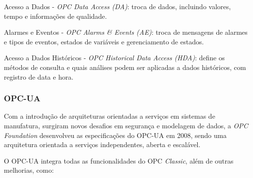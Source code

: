         \begin{alineascomponto}
        	\item Acesso a Dados - \textit{\gls{OPC} Data Access (DA)}: troca de dados, incluindo valores, tempo e informações de qualidade.
        	\item Alarmes e Eventos - \textit{\gls{OPC} Alarms \& Events (AE)}: troca de mensagens de alarmes e tipos de eventos, estados de variáveis e gerenciamento de estados.
        	\item Acesso a Dados Históricos - \textit{\gls{OPC} Historical Data Access (HDA)}: define os métodos de consulta e quais análises podem ser aplicadas a dados históricos, com registro de data e hora.
        \end{alineascomponto}

    \subsubsection{OPC-UA}
    \label{sec:opc-ua}

        Com a introdução de arquiteturas orientadas a serviços em sistemas de manufatura, surgiram novos desafios em segurança e modelagem de dados, a \textit{OPC Foundation} desenvolveu as especificações do \gls{OPC-UA} em 2008, sendo uma arquitetura orientada a serviços independentes, aberta e escalável.
        
	    \begin{figure}[!h]
	    \end{figure}
        
        O \gls{OPC-UA} integra todas as funcionalidades do \gls{OPC} \textit{Classic}, além de outras melhorias, como:
        
